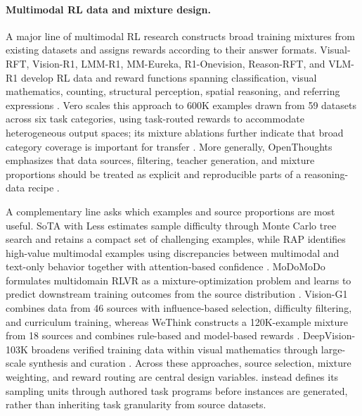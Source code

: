 \paragraph{Multimodal RL data and mixture design.}
A major line of multimodal RL research constructs broad training mixtures from
existing datasets and assigns rewards according to their answer formats.
Visual-RFT, Vision-R1, LMM-R1, MM-Eureka, R1-Onevision, Reason-RFT, and
VLM-R1 develop RL data and reward functions spanning classification, visual
mathematics, counting, structural perception, spatial reasoning, and referring
expressions
\citep{liu2025visualrft,huang2025visionr1,peng2025lmmr1,
meng2025mmeureka,yang2025r1onevision,tan2025reasonrft,shen2025vlmr1}.
Vero scales this approach to 600K examples drawn from 59 datasets across six
task categories, using task-routed rewards to accommodate heterogeneous output
spaces; its mixture ablations further indicate that broad category coverage is
important for transfer \citep{sarch2026vero}. More generally, OpenThoughts
emphasizes that data sources, filtering, teacher generation, and mixture proportions
should be treated as explicit and reproducible parts of a reasoning-data recipe
\citep{guha2025openthoughts}.

A complementary line asks which examples and source proportions are most useful.
SoTA with Less estimates sample difficulty through Monte Carlo tree search and
retains a compact set of challenging examples, while RAP identifies high-value
multimodal examples using discrepancies between multimodal and text-only behavior
together with attention-based confidence
\citep{wang2025sotawithless,li2025truth}. MoDoMoDo formulates multidomain
RLVR as a mixture-optimization problem and learns to predict downstream training
outcomes from the source distribution \citep{liang2025modomodo}. Vision-G1
combines data from 46 sources with influence-based selection, difficulty filtering,
and curriculum training, whereas WeThink constructs a 120K-example mixture from
18 sources and combines rule-based and model-based rewards
\citep{zha2026visiong1,yang2025wethink}. DeepVision-103K broadens verified
training data within visual mathematics through large-scale synthesis and curation
\citep{sun2026deepvision}. Across these approaches, source selection, mixture
weighting, and reward routing are central design variables. \trace instead defines
its sampling units through authored task programs before instances are generated,
rather than inheriting task granularity from source datasets.


